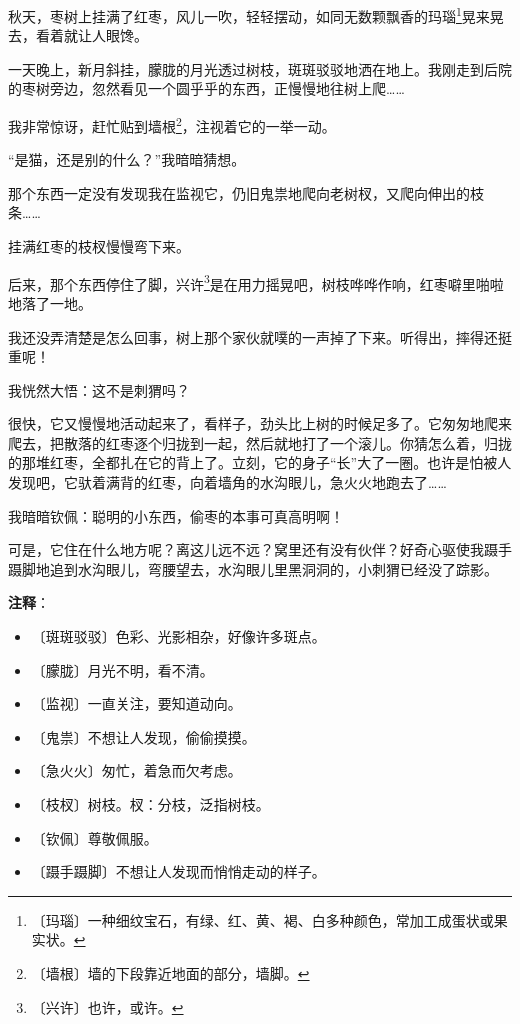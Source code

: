 \documentclass[12pt,UTF-8,openany]{ctexbook}
\begin{document}
\begin{large}
    
    秋天，枣树上挂满了红枣，风儿一吹，轻轻摆动，如同无数颗飘香的玛瑙\footnote{〔玛瑙〕一种细纹宝石，有绿、红、黄、褐、白多种颜色，常加工成蛋状或果实状。}晃来晃去，看着就让人眼馋。
    
    一天晚上，新月斜挂，朦胧的月光透过树枝，斑斑驳驳地洒在地上。我刚走到后院的枣树旁边，忽然看见一个圆乎乎的东西，正慢慢地往树上爬……
    
    我非常惊讶，赶忙贴到墙根\footnote{〔墙根〕墙的下段靠近地面的部分，墙脚。}，注视着它的一举一动。
    
    “是猫，还是别的什么？”我暗暗猜想。
    
    那个东西一定没有发现我在监视它，仍旧鬼祟地爬向老树杈，又爬向伸出的枝条……
    
    挂满红枣的枝杈慢慢弯下来。
    
    后来，那个东西停住了脚，兴许\footnote{〔兴许〕也许，或许。}是在用力摇晃吧，树枝哗哗作响，红枣噼里啪啦地落了一地。
    
    我还没弄清楚是怎么回事，树上那个家伙就噗的一声掉了下来。听得出，摔得还挺重呢！
    
    我恍然大悟：这不是刺猬吗？
    
    很快，它又慢慢地活动起来了，看样子，劲头比上树的时候足多了。它匆匆地爬来爬去，把散落的红枣逐个归拢到一起，然后就地打了一个滚儿。你猜怎么着，归拢的那堆红枣，全都扎在它的背上了。立刻，它的身子“长”大了一圈。也许是怕被人发现吧，它驮着满背的红枣，向着墙角的水沟眼儿，急火火地跑去了……
    
    我暗暗钦佩：聪明的小东西，偷枣的本事可真高明啊！
    
    可是，它住在什么地方呢？离这儿远不远？窝里还有没有伙伴？好奇心驱使我蹑手蹑脚地追到水沟眼儿，弯腰望去，水沟眼儿里黑洞洞的，小刺猬已经没了踪影。
    
\end{large}


\newpage

\textbf{注释}：

\vspace{-1em}

\begin{itemize}
    \setlength\itemsep{-0.2em}
    \item 〔斑斑驳驳〕色彩、光影相杂，好像许多斑点。
    \item 〔朦胧〕月光不明，看不清。
    \item 〔监视〕一直关注，要知道动向。
    \item 〔鬼祟〕不想让人发现，偷偷摸摸。
    \item 〔急火火〕匆忙，着急而欠考虑。
    \item 〔枝杈〕树枝。杈：分枝，泛指树枝。
    \item 〔钦佩〕尊敬佩服。
    \item 〔蹑手蹑脚〕不想让人发现而悄悄走动的样子。
\end{itemize}
\end{document}
